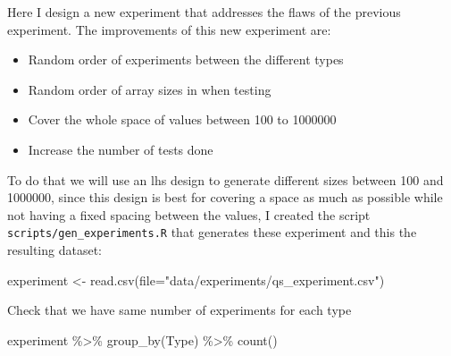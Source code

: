 \documentclass[
]{article}
\newenvironment{Shaded}{\begin{snugshade}}{\end{snugshade}}
\newcommand{\AttributeTok}[1]{\textcolor[rgb]{0.77,0.63,0.00}{#1}}
\newcommand{\DecValTok}[1]{\textcolor[rgb]{0.00,0.00,0.81}{#1}}
\newcommand{\FunctionTok}[1]{\textcolor[rgb]{0.00,0.00,0.00}{#1}}
\newcommand{\NormalTok}[1]{#1}
\newcommand{\OtherTok}[1]{\textcolor[rgb]{0.56,0.35,0.01}{#1}}
\newcommand{\SpecialCharTok}[1]{\textcolor[rgb]{0.00,0.00,0.00}{#1}}
\newcommand{\StringTok}[1]{\textcolor[rgb]{0.31,0.60,0.02}{#1}}
\providecommand{\tightlist}{%
  \setlength{\itemsep}{0pt}\setlength{\parskip}{0pt}}
\begin{document}
Here I design a new experiment that addresses the flaws of the previous
experiment. The improvements of this new experiment are:

\begin{itemize}
\tightlist
\item
  Random order of experiments between the different types
\item
  Random order of array sizes in when testing
\item
  Cover the whole space of values between 100 to 1000000
\item
  Increase the number of tests done
\end{itemize}

To do that we will use an lhs design to generate different sizes between
100 and 1000000, since this design is best for covering a space as much
as possible while not having a fixed spacing between the values, I
created the script \texttt{scripts/gen\_experiments.R} that generates
these experiment and this the resulting dataset:

\begin{Shaded}
\begin{Highlighting}[]
\NormalTok{experiment }\OtherTok{\textless{}{-}} \FunctionTok{read.csv}\NormalTok{(}\AttributeTok{file=}\StringTok{"data/experiments/qs\_experiment.csv"}\NormalTok{)}
\end{Highlighting}
\end{Shaded}

Check that we have same number of experiments for each type

\begin{Shaded}
\end{Shaded}

\begin{Shaded}
\begin{Highlighting}[]
\NormalTok{experiment }\SpecialCharTok{\%\textgreater{}\%} \FunctionTok{group\_by}\NormalTok{(Type) }\SpecialCharTok{\%\textgreater{}\%} \FunctionTok{count}\NormalTok{()}
\end{Highlighting}
\end{Shaded}
\end{document}
